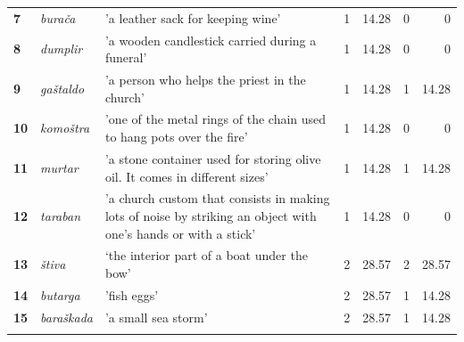 \documentclass[output=paper]{LSP/langsci}
\begin{document}
\begin{table}
{\begin{tabular}{lp{2cm}p{5cm}lrlr}
{\bfseries 7} & {\itshape burača} & 'a leather sack for keeping wine' & 1 & 14.28 & 0 & 0\\

{\bfseries 8} & {\itshape dumplir} & 'a wooden candlestick carried during a funeral' & 1 & 14.28 & 0 & 0\\

{\bfseries 9} & {\itshape gaštaldo} & 'a person who helps the priest in the church' & 1 & 14.28 & 1 & 14.28\\

{\bfseries 10} & {\itshape komoštra} & 'one of the metal rings of the chain used to hang pots over the fire' & 1 & 14.28 & 0 & 0\\

{\bfseries 11} & {\itshape murtar} & 'a stone container used for storing olive oil. It comes in different sizes' & 1 & 14.28 & 1 & 14.28\\

{\bfseries 12} & {\itshape taraban} & 'a church custom that consists in making lots of noise by striking an object with one's hands or with a stick' & 1 & 14.28 & 0 & 0\\

{\bfseries 13} & {\itshape štiva} & ‘the interior part of a boat under the bow' & 2 & 28.57 & 2 & 28.57\\

{\bfseries 14} & {\itshape butarga} & 'fish eggs' & 2 & 28.57 & 1 & 14.28\\

{\bfseries 15} & {\itshape baraškada} & 'a small sea storm' & 2 & 28.57 & 1 & 14.28\\

\lspbottomrule
\end{tabular}
}
\end{table}
\end{document}
